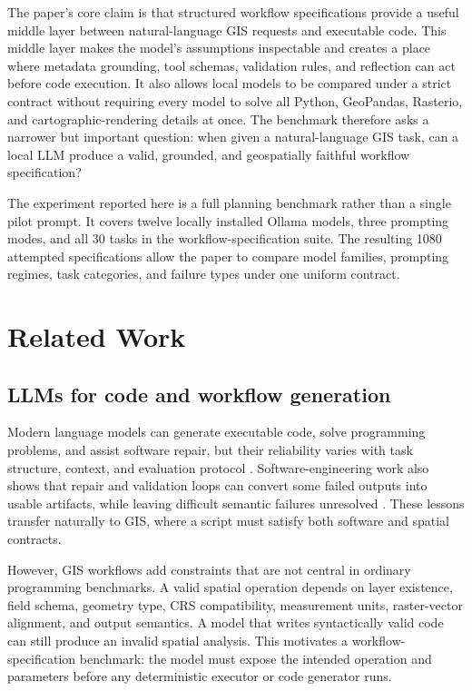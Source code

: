 \documentclass[]{interact}
\begin{document}
The paper's core claim is that structured workflow specifications provide a useful middle layer between natural-language GIS requests and executable code. This middle layer makes the model's assumptions inspectable and creates a place where metadata grounding, tool schemas, validation rules, and reflection can act before code execution. It also allows local models to be compared under a strict contract without requiring every model to solve all Python, GeoPandas, Rasterio, and cartographic-rendering details at once. The benchmark therefore asks a narrower but important question: when given a natural-language GIS task, can a local LLM produce a valid, grounded, and geospatially faithful workflow specification?

The experiment reported here is a full planning benchmark rather than a single pilot prompt. It covers twelve locally installed Ollama models, three prompting modes, and all 30 tasks in the workflow-specification suite. The resulting 1080 attempted specifications allow the paper to compare model families, prompting regimes, task categories, and failure types under one uniform contract.

\section{Related Work}

\subsection{LLMs for code and workflow generation}

Modern language models can generate executable code, solve programming problems, and assist software repair, but their reliability varies with task structure, context, and evaluation protocol \citep{Li_2022,Xu_2022,Du_2024,Ni_2024,Jiang_2026}. Software-engineering work also shows that repair and validation loops can convert some failed outputs into usable artifacts, while leaving difficult semantic failures unresolved \citep{Gazzola_2019,Monperrus_2018,Le_Goues_2012}. These lessons transfer naturally to GIS, where a script must satisfy both software and spatial contracts.

However, GIS workflows add constraints that are not central in ordinary programming benchmarks. A valid spatial operation depends on layer existence, field schema, geometry type, CRS compatibility, measurement units, raster-vector alignment, and output semantics. A model that writes syntactically valid code can still produce an invalid spatial analysis. This motivates a workflow-specification benchmark: the model must expose the intended operation and parameters before any deterministic executor or code generator runs.
\end{document}
